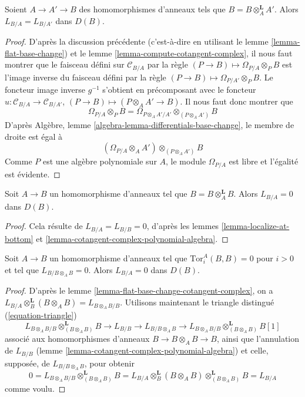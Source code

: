 \begin{lemma}
\label{lemma-localize-at-bottom}
Soient $A \to A' \to B$ des homomorphismes d'anneaux tels que
$B = B \otimes_A^\mathbf{L} A'$. Alors $L_{B/A} = L_{B/A'}$ dans $D(B)$.
\end{lemma}

\begin{proof}
D'après la discussion précédente (c'est-à-dire en utilisant le lemme
\ref{lemma-flat-base-change}) et le lemme
\ref{lemma-compute-cotangent-complex}, il nous faut montrer que le faisceau
défini sur $\mathcal{C}_{B/A}$ par la règle
$(P \to B) \mapsto \Omega_{P/A} \otimes_P B$ est l'image inverse du faisceau
défini par la règle $(P \to B) \mapsto \Omega_{P/A'} \otimes_P B$.
Le foncteur image inverse $g^{-1}$ s'obtient en précomposant avec le foncteur
$u : \mathcal{C}_{B/A} \to \mathcal{C}_{B/A'}$,
$(P \to B) \mapsto (P \otimes_A A' \to B)$. Il nous faut donc montrer que
$$
\Omega_{P/A} \otimes_P B =
\Omega_{P \otimes_A A'/A'} \otimes_{(P \otimes_A A')} B
$$
D'après Algèbre, lemme \ref{algebra-lemma-differentials-base-change}, le
membre de droite est égal à
$$
(\Omega_{P/A} \otimes_A A') \otimes_{(P \otimes_A A')} B
$$
Comme $P$ est une algèbre polynomiale sur $A$, le module $\Omega_{P/A}$ est
libre et l'égalité est évidente.
\end{proof}

\begin{lemma}
\label{lemma-derived-diagonal}
Soit $A \to B$ un homomorphisme d'anneaux tel que
$B = B \otimes_A^\mathbf{L} B$. Alors $L_{B/A} = 0$ dans $D(B)$.
\end{lemma}

\begin{proof}
Cela résulte de $L_{B/A} = L_{B/B} = 0$, d'après les lemmes
\ref{lemma-localize-at-bottom} et
\ref{lemma-cotangent-complex-polynomial-algebra}.
\end{proof}

\begin{lemma}
\label{lemma-bootstrap}
Soit $A \to B$ un homomorphisme d'anneaux tel que
$\text{Tor}^A_i(B, B) = 0$ pour $i > 0$ et tel que
$L_{B/B \otimes_A B} = 0$. Alors $L_{B/A} = 0$ dans $D(B)$.
\end{lemma}

\begin{proof}
D'après le lemme \ref{lemma-flat-base-change-cotangent-complex}, on a
$L_{B/A} \otimes_B^\mathbf{L} (B \otimes_A B) = L_{B \otimes_A B/B}$.
Utilisons maintenant le triangle distingué (\ref{equation-triangle})
$$
L_{B \otimes_A B/B} \otimes^\mathbf{L}_{(B \otimes_A B)} B \to
L_{B/B} \to L_{B/B \otimes_A B} \to
L_{B \otimes_A B/B} \otimes^\mathbf{L}_{(B \otimes_A B)} B[1]
$$
associé aux homomorphismes d'anneaux $B \to B \otimes_A B \to B$, ainsi que
l'annulation de $L_{B/B}$ (lemme
\ref{lemma-cotangent-complex-polynomial-algebra}) et celle, supposée, de
$L_{B/B \otimes_A B}$, pour obtenir
$$
0 =
L_{B \otimes_A B/B} \otimes^\mathbf{L}_{(B \otimes_A B)} B =
L_{B/A} \otimes_B^\mathbf{L} (B \otimes_A B)
\otimes^\mathbf{L}_{(B \otimes_A B)} B = L_{B/A}
$$
comme voulu.
\end{proof}

